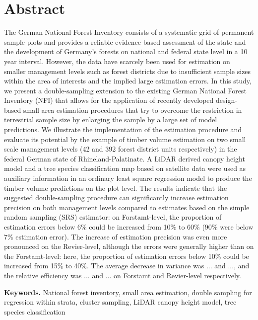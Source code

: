 
\section*{Abstract} 
\label{sec:abstract}
The German National Forest Inventory consists of a systematic grid of permanent sample plots and provides a reliable evidence-based assessment of the state and the development of Germany's forests on national and federal state level in a 10 year interval. However, the data have scarcely been used for estimation on smaller management levels such as forest districts due to insufficient sample sizes within the area of interests and the implied large estimation errors. In this study, we present a double-sampling extension to the existing German National Forest Inventory (NFI) that allows for the application of recently developed design-based small area estimation procedures that try to overcome the restriction in terrestrial sample size by enlarging the sample by a large set of model predictions. We illustrate the implementation of the estimation procedure and evaluate its potential by the example of timber volume estimation on two small scale management levels (42 and 392 forest district units respectively) in the federal German state of Rhineland-Palatinate. A LiDAR derived canopy height model and a tree species classification map based on satellite data were used as auxiliary information in an ordinary least square regression model to produce the timber volume predictions on the plot level. The results indicate that the suggested double-sampling procedure can significantly increase estimation precision on both management levels compared to estimates based on the simple random sampling (SRS) estimator: on Forstamt-level, the proportion of estimation errors below 6\% could be increased from 10\% to 60\% (90\% were below 7\% estimation error). The increase of estimation precision was even more pronounced on the Revier-level, although the errors were generally higher than on the Forstamt-level: here, the proportion of estimation errors below 10\% could be increased from 15\% to 40\%. The average decrease in variance was ... and ..., and the relative efficiency was ... and ... on Forstamt and Revier-level respectively.




\vspace{0.2cm} \noindent \textbf{Keywords.} National forest inventory, small area estimation, double sampling for regression within strata, cluster sampling, LiDAR canopy height model, tree species classification \vspace{-1cm}


